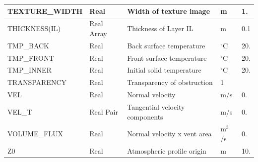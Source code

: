 \documentclass[11pt]{book}
\begin{document}
\begin{longtable}{|l|l|l|l|l|}
{\ct TEXTURE\_WIDTH}                  & Real            & Width of texture image            & m                   & 1.     \\ \hline
{\ct THICKNESS(IL)}                   & Real Array      & Thickness of Layer {\ct IL}       & m                   & 0.1    \\ \hline
{\ct TMP\_BACK}                       & Real            & Back surface temperature          & $^\circ$C           & 20.    \\ \hline
{\ct TMP\_FRONT}                      & Real            & Front surface temperature         & $^\circ$C           & 20.    \\ \hline
{\ct TMP\_INNER}                      & Real            & Initial solid temperature         & $^\circ$C           & 20.    \\ \hline
{\ct TRANSPARENCY}                    & Real            & Transparency of obstruction       &    1                &           \\ \hline
{\ct VEL    }                         & Real            & Normal velocity                   & m/s                 & 0.     \\ \hline
{\ct VEL\_T }                         & Real Pair       & Tangential velocity components    & m/s                 & 0.     \\ \hline
{\ct VOLUME\_FLUX}                    & Real            & Normal velocity x vent area       & m$^3$/s             & 0.     \\ \hline
{\ct Z0 }                             & Real            & Atmospheric profile origin        &  m                  & 10.    \\ \hline
\end{longtable}



\vspace{\baselineskip}
\end{document}
